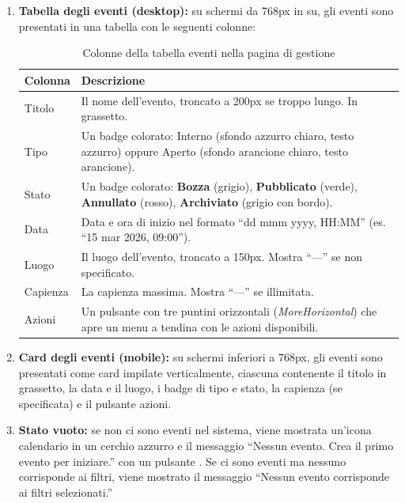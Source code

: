 \documentclass[a4paper,11pt,oneside]{book}
\newcommand{\pulsante}[1]{\fcolorbox{namoCharcoal}{namoGray}{\small\textsf{\textbf{#1}}}}
\begin{document}
\begin{enumerate}[leftmargin=1.5em]
    I filtri funzionano in modo combinato: \`e possibile, ad esempio, visualizzare solo gli eventi pubblicati di tipo interno nel settore Clown Terapia.

  \item \textbf{Tabella degli eventi (desktop):} su schermi da 768px in su, gli eventi sono presentati in una tabella con le seguenti colonne:

    \begin{table}[htbp]
    \centering
    \caption{Colonne della tabella eventi nella pagina di gestione}
    \label{tab:colonne-tabella-eventi}
    \begin{tabularx}{\textwidth}{l X}
    \toprule
    \textbf{Colonna} & \textbf{Descrizione} \\
    \midrule
    Titolo        & Il nome dell'evento, troncato a 200px se troppo lungo. In grassetto. \\
    Tipo          & Un badge colorato: \textcolor{namoCyan}{Interno} (sfondo azzurro chiaro, testo azzurro) oppure \textcolor{namoOrange}{Aperto} (sfondo arancione chiaro, testo arancione). \\
    Stato         & Un badge colorato: \textbf{Bozza} (grigio), \textcolor{namoGreen}{\textbf{Pubblicato}} (verde), \textcolor{namoRed}{\textbf{Annullato}} (rosso), \textbf{Archiviato} (grigio con bordo). \\
    Data          & Data e ora di inizio nel formato ``dd mmm yyyy, HH:MM'' (es. ``15 mar 2026, 09:00''). \\
    Luogo         & Il luogo dell'evento, troncato a 150px. Mostra ``---'' se non specificato. \\
    Capienza      & La capienza massima. Mostra ``---'' se illimitata. \\
    Azioni        & Un pulsante con tre puntini orizzontali (\textit{MoreHorizontal}) che apre un menu a tendina con le azioni disponibili. \\
    \bottomrule
    \end{tabularx}
    \end{table}

  \item \textbf{Card degli eventi (mobile):} su schermi inferiori a 768px, gli eventi sono presentati come card impilate verticalmente, ciascuna contenente il titolo in grassetto, la data e il luogo, i badge di tipo e stato, la capienza (se specificata) e il pulsante azioni.

  \item \textbf{Stato vuoto:} se non ci sono eventi nel sistema, viene mostrata un'icona calendario in un cerchio azzurro e il messaggio ``Nessun evento. Crea il primo evento per iniziare.'' con un pulsante \pulsante{Crea evento}. Se ci sono eventi ma nessuno corrisponde ai filtri, viene mostrato il messaggio ``Nessun evento corrisponde ai filtri selezionati.''
\end{enumerate}
\end{document}
